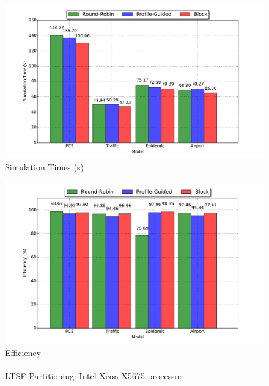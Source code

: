 \documentclass[11pt]{book}
\begin{document}
\begin{figure}
  \begin{minipage}{.5\textwidth}
    \begin{center}
      \includegraphics[width=\textwidth,keepaspectratio,quiet]{figs/pending_event_set/partitioning_time.pdf} \\
      Simulation Times (s) \\
    \end{center}
  \end{minipage}%
  \hfill
  \begin{minipage}{.5\textwidth}
    \begin{center}
      \includegraphics[width=\textwidth,keepaspectratio,quiet]{figs/pending_event_set/partitioning_efficiency.pdf} \\
      Efficiency \\
    \end{center}
  \end{minipage}
  \caption{LTSF Partitioning: Intel\textsuperscript{\textregistered} Xeon\textsuperscript{\textregistered} X5675 processor}
  \label{ltsf_partitioning_bc}
\end{figure}
\end{document}
